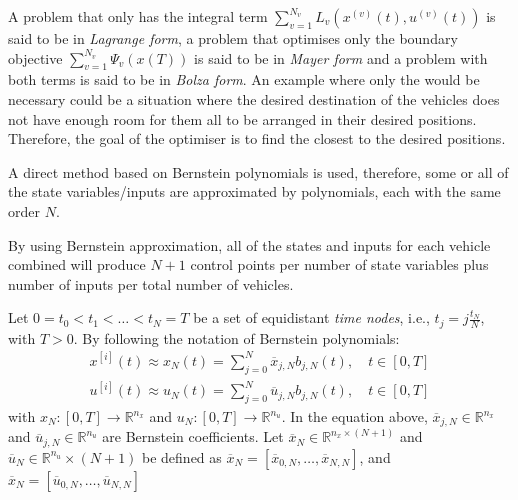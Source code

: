 \par A problem that only has the integral term $\sum_{v=1}^{N_v} L_v(x^{(v)}(t),u^{(v)}(t))$ is said to be in \textit{Lagrange form}, a problem that optimises only the boundary objective $\sum_{v=1}^{N_v} \Psi_v(x(T))$ is said to be in \textit{Mayer form} and a problem with both terms is said to be in \textit{Bolza form}. An example where only the  would be necessary could be a situation where the desired destination of the vehicles does not have enough room for them all to be arranged in their desired positions. Therefore, the goal of the optimiser is to find the closest to the desired positions.

\par A direct method based on Bernstein polynomials is used, therefore, some or all of the state variables/inputs are approximated by polynomials, each with the same order $N$.

\par By using Bernstein approximation, all of the states and inputs for each vehicle combined will produce $N+1$ control points per number of state variables plus number of inputs per total number of vehicles. 
\par Let $0=t_0<t_1<\dots<t_N=T$ be a set of equidistant \textit{time nodes}, i.e., $t_j= j\frac{t_N}{N}$, with $T>0$. By following the notation of Bernstein polynomials:
\begin{equation}
    \begin{gathered}
        x^{[i]}(t) \approx x_N(t) = \sum_{j=0}^N \overline{x}_{j,N} b_{j,N}(t), \quad t\in[0,T] \\
        u^{[i]}(t) \approx u_N(t) = \sum_{j=0}^N \overline{u}_{j,N} b_{j,N}(t), \quad t\in[0,T]
    \end{gathered}
\end{equation}
with $x_N: [0,T]\rightarrow \mathbb{R}^{n_x}$ and $u_N:[0,T]\rightarrow \mathbb{R}^{n_u}$. In the equation above, $\overline{x}_{j,N}\in \mathbb{R}^{n_x}$ and $\overline{u}_{j,N}\in \mathbb{R}^{n_u}$ are Bernstein coefficients. Let $\overline{x}_N\in \mathbb{R}^{n_x\times (N+1)}$ and $\overline{u}_N\in \mathbb{R}^{n_u}\times(N+1)$ be defined as $\overline{x}_N = [\overline{x}_{0,N},\dots, \overline{x}_{N,N}]$, and $\overline{x}_N = [\overline{u}_{0,N},\dots, \overline{u}_{N,N}]$

